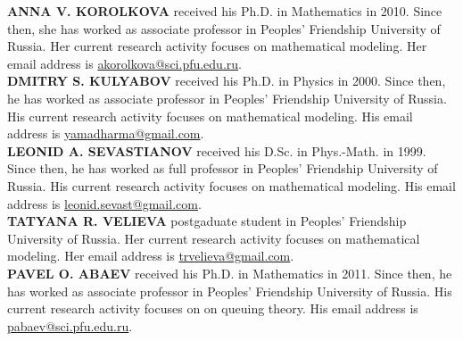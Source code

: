 
\noindent\textbf{\MakeUppercase{Anna V. Korolkova}}
received his Ph.D. in Mathematics
in 2010. Since then, she has worked as associate professor in Peoples'
Friendship University of Russia. Her current research activity focuses
on mathematical modeling. Her email address is \url{akorolkova@sci.pfu.edu.ru}.\\

\noindent\textbf{\MakeUppercase{Dmitry S. Kulyabov}}
received his Ph.D. in Physics
in 2000. Since then, he has worked as associate professor in Peoples'
Friendship University of Russia. His current research activity focuses
on mathematical modeling. His email address is \url{yamadharma@gmail.com}.\\

\noindent\textbf{\MakeUppercase{Leonid A. Sevastianov}}
received his D.Sc. in Phys.-Math.
in 1999. Since then, he has worked as full professor in Peoples'
Friendship University of Russia. His current research activity focuses
on mathematical modeling. His email address is \url{leonid.sevast@gmail.com}.\\

\noindent\textbf{\MakeUppercase{Tatyana R. Velieva}}
postgaduate student in Peoples'
Friendship University of Russia. Her current research activity focuses
on mathematical modeling. Her email address is \url{trvelieva@gmail.com}.\\

\noindent\textbf{\MakeUppercase{Pavel O. Abaev}}
received his Ph.D. in Mathematics
in 2011. Since then, he has worked as associate professor in Peoples'
Friendship University of Russia. His current research activity focuses
on on queuing theory. His email address is \url{pabaev@sci.pfu.edu.ru}.

